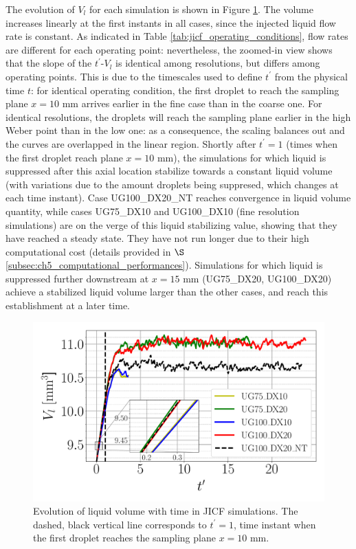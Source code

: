 The evolution of $V_l$ for each simulation is shown in 
Figure \ref{fig:JICF_liquid_volume_increase}. The volume increases linearly at the first instants in all cases, since the injected liquid flow rate is constant. As indicated in Table \ref{tab:jicf_operating_conditions}, flow rates are different for each operating point: nevertheless, the zoomed-in view shows that the slope of the $t^{\prime}$-$V_l$ is identical among resolutions, but differs among operating points. This is due to the timescales used to define $t^{\prime}$ from the physical time $t$: for identical operating condition, the first droplet to reach the sampling plane $x = 10$ mm arrives earlier in the fine case than in the coarse one. For identical resolutions, the droplets will reach the sampling plane earlier in the high Weber point than in the low one: as a consequence, the scaling balances out and the curves are overlapped in the linear region. Shortly after $t^{\prime} = 1$ (times when the first droplet reach plane $x = 10$ mm), the simulations for which liquid is suppressed after this axial location stabilize towards a constant liquid volume (with variations due to the amount droplets being suppresed, which changes at each time instant). Case UG100\_DX20\_NT reaches convergence in liquid volume quantity, while cases UG75\_DX10 and UG100\_DX10 (fine resolution simulations) are on the verge of this liquid stabilizing value, showing that they have reached a steady state. They have not run longer due to their high computational cost (details provided in $\S$\ref{subsec:ch5_computational_performances}). Simulations for which liquid is suppressed further downstream at $x = 15$ mm (UG75\_DX20, UG100\_DX20) achieve a stabilized liquid volume larger than the other cases, and reach this establishment at a later time.


\begin{figure}[ht]
\centering
	\centering
   \includegraphics[scale=0.3]{./part2_developments/figures_ch5_resolved_JICF/JICF_liquid_volume_increase}
   \vspace*{-0.15in}
   \caption[Evolution of liquid volume with time in JICF simulations.]{Evolution of liquid volume with time in JICF simulations. The dashed, black vertical line corresponds to $t^\prime = 1$, time instant when the first droplet reaches the sampling plane $x = 10$ mm.}
\label{fig:JICF_liquid_volume_increase}
\end{figure}

